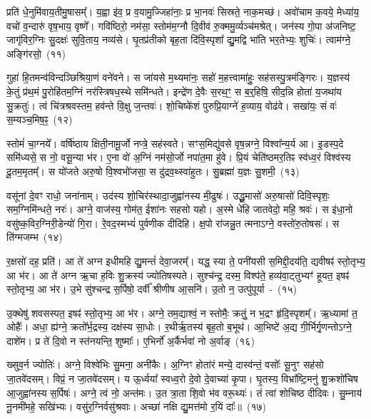 प्रति॑ धे॒नुमि॑वाय॒तीमु॒षासम्᳚। य॒ह्वा इ॑व॒ प्र व॒यामु॒ज्जिहा॑नाः॒ प्र भा॒नवः॑ सिस्रते॒ नाक॒मच्छ॑। अवो॑चाम क॒वये॒ मेध्या॑य॒ वचो॑ व॒न्दारु॑ वृष॒भाय॒ वृष्णे᳚। गवि॑ष्ठिरो॒ नम॑सा॒ स्तोम॑म॒ग्नौ दि॒वीव॑ रु॒क्ममु॒र्व्यञ्च॑मश्रेत्। जन॑स्य गो॒पा अ॑जनिष्ट॒ जागृ॑विर॒ग्निः सु॒दक्षः॑ सुवि॒ताय॒ नव्य॑से। घृ॒तप्र॑तीको बृह॒ता दि॑वि॒स्पृशा᳚ द्यु॒मद्वि भा॑ति भर॒तेभ्यः॒ शुचिः॑। त्वाम॑ग्ने॒ अङ्गि॑रसो॒~(११)

गुहा॑ हि॒तमन्व॑विन्दञ्छिश्रिया॒णं वने॑वने। स जा॑यसे म॒थ्यमा॑नः॒ सहो॑ म॒हत्त्वामा॑हुः॒ सह॑सस्पु॒त्रम॑ङ्गिरः। य॒ज्ञस्य॑ के॒तुं प्र॑थ॒मं पु॒रोहि॑तम॒ग्निं नर॑स्त्रिषध॒स्थे समि॑न्धते। इन्द्रे॑ण दे॒वैः स॒रथ॒ꣳ॒ स ब॒र्॒\mbox{}हिषि॒ सीद॒न्नि होता॑ य॒जथा॑य सु॒क्रतुः॑। त्वं चि॑त्रश्रवस्तम॒ हव॑न्ते वि॒क्षु ज॒न्तवः॑। शो॒चिष्के॑शं पुरुप्रि॒याग्ने॑ ह॒व्याय॒ वोढ॑वे। सखा॑यः॒ सं वः॑ स॒म्यञ्च॒मिष॒ꣴ॒~(१२)

स्तोमं॑ चा॒ग्नये᳚। वर्\mbox{}षि॑ष्ठाय क्षिती॒नामू॒र्जो नप्त्रे॒ सह॑स्वते। सꣳस॒मिद्यु॑वसे वृष॒न्नग्ने॒ विश्वा᳚न्य॒र्य आ। इ॒डस्प॒दे समि॑ध्यसे॒ स नो॒ वसू॒न्या भ॑र। ए॒ना वो॑ अ॒ग्निं नम॑सो॒र्जो नपा॑त॒मा हु॑वे। प्रि॒यं चेति॑ष्ठमर॒तिꣴ स्व॑ध्व॒रं विश्व॑स्य दू॒तम॒मृतम्᳚। स यो॑जते अरु॒षो वि॒श्वभो॑जसा॒ स दु॑द्रव॒थ्\-स्वा॑हुतः। सु॒ब्रह्मा॑ य॒ज्ञः सु॒शमी॒~(१३)

वसू॑नां दे॒वꣳ राधो॒ जना॑नाम्। उद॑स्य शो॒चिर॑स्थादा॒जुह्वा॑नस्य मी॒ढुषः॑। उद्धू॒मासो॑ अरु॒षासो॑ दिवि॒स्पृशः॒ सम॒ग्निमि॑न्धते॒ नरः॑। अग्ने॒ वाज॑स्य॒ गोम॑त॒ ईशा॑नः सहसो यहो। अ॒स्मे धे॑हि जातवेदो॒ महि॒ श्रवः॑। स इ॑धा॒नो वसु॑ष्क॒विर॒ग्निरी॒डेन्यो॑ गि॒रा। रे॒वद॒स्मभ्यं॑ पुर्वणीक दीदिहि। क्ष॒पो रा॑जन्नु॒त त्मनाऽग्ने॒ वस्तो॑रु॒तोषसः॑। स ति॑ग्मजम्भ~(१४)

र॒क्षसो॑ दह॒ प्रति॑। आ ते॑ अग्न इधीमहि द्यु॒मन्तं॑ देवा॒जरम्᳚। यद्ध॒ स्या ते॒ पनी॑यसी स॒मिद्दी॒दय॑ति॒ द्यवीषꣴ॑ स्तो॒तृभ्य॒ आ भ॑र। आ ते॑ अग्न ऋ॒चा ह॒विः शु॒क्रस्य॑ ज्योतिषस्पते। सुश्च॑न्द्र॒ दस्म॒ विश्प॑ते॒ हव्य॑वा॒ट्तुभ्यꣳ॑ हूयत॒ इषꣴ॑ स्तो॒तृभ्य॒ आ भ॑र। उ॒भे सु॑श्चन्द्र स॒र्पिषो॒ दर्वी᳚ श्रीणीष आ॒सनि॑। उ॒तो न॒ उत्पु॑पूर्या~-~(१५)

उ॒क्थेषु॑ शवसस्पत॒ इषꣴ॑ स्तो॒तृभ्य॒ आ भ॑र। अग्ने॒ तम॒द्याश्वं॒ न स्तोमैः॒ क्रतुं॒ न भ॒द्रꣳ हृ॑दि॒स्पृशम्᳚। ऋ॒ध्यामा॑ त॒ ओहैः᳚। अधा॒ ह्य॑ग्ने॒ क्रतो᳚र्भ॒द्रस्य॒ दक्ष॑स्य सा॒धोः। र॒थीर्\mbox{}ऋ॒तस्य॑ बृह॒तो ब॒भूथ॑। आ॒भिष्टे॑ अ॒द्य गी॒र्भिर्गृ॒णन्तो\-ऽग्ने॒ दाशे॑म। प्र ते॑ दि॒वो न स्त॑नयन्ति॒ शुष्माः᳚। ए॒भिर्नो॑ अ॒र्कैर्भवा॑ नो अ॒र्वाङ्~(१६)

ख्सुव॒र्न ज्योतिः॑। अग्ने॒ विश्वे॑भिः सु॒मना॒ अनी॑कैः। अ॒ग्निꣳ होता॑रं मन्ये॒ दास्व॑न्तं॒ वसोः᳚ सू॒नुꣳ सह॑सो जा॒तवे॑दसम्। विप्रं॒ न जा॒तवे॑दसम्। य ऊ॒र्ध्वया᳚ स्वध्व॒रो दे॒वो दे॒वाच्या॑ कृ॒पा। घृ॒तस्य॒ विभ्रा᳚ष्टि॒मनु॑ शु॒क्रशो॑चिष आ॒जुह्वा॑नस्य स॒र्पिषः॑। अग्ने॒ त्वं नो॒ अन्त॑मः। उ॒त त्रा॒ता शि॒वो भ॑व वरू॒थ्यः॑। तं त्वा॑ शोचिष्ठ दीदिवः। सु॒म्नाय॑ नू॒नमी॑महे॒ सखि॑भ्यः। वसु॑र॒ग्निर्वसु॑श्रवाः। अच्छा॑ नक्षि द्यु॒मत्त॑मो र॒यिं दाः᳚॥~(१७)

